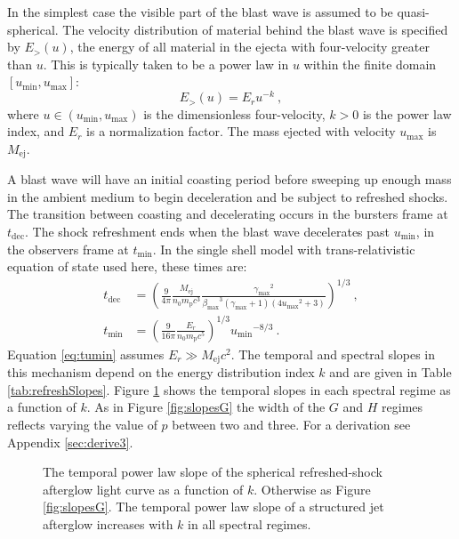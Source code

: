 \documentclass[twocolumn]{aastex62}
\newcommand{\Mej}{\ensuremath{M_{\mathrm{ej}}}}
\newcommand{\tdec}{\ensuremath{t_{\mathrm{dec}}}}
\newcommand{\tumin}{\ensuremath{t_{\mathrm{min}}}}
\newcommand{\Mp}{\ensuremath{m_{\mathrm{p}}}}
\newcommand{\umin}{\ensuremath{u_{\mathrm{min}}}}
\newcommand{\umax}{\ensuremath{u_{\mathrm{max}}}}
\newcommand{\gmax}{\ensuremath{\gamma_{\mathrm{max}}}}
\newcommand{\bmax}{\ensuremath{\beta_{\mathrm{max}}}}
\begin{document}
In the simplest case the visible part of the blast wave is assumed to be quasi-spherical.  The velocity distribution of material behind the blast wave is specified by $E_{>}(u)$, the energy of all material in the ejecta with four-velocity greater than $u$.  This is typically taken to be a power law in $u$ within the finite domain $[\umin, \umax]$:
\begin{equation}
	E_>(u) = E_r u^{-k}\ , \label{eq:Eu}
\end{equation}
where $u \in (\umin, \umax)$ is the dimensionless four-velocity, $k>0$ is the power law index, and $E_r$ is a normalization factor.  The mass ejected with velocity $\umax$ is $\Mej$.

%
%

A blast wave will have an initial coasting period before sweeping up enough mass in the ambient medium to begin deceleration and be subject to refreshed shocks.  The transition between coasting and decelerating occurs in the bursters frame at $\tdec$. The shock refreshment ends when the blast wave decelerates past $\umin$, in the observers frame at $\tumin$.  In the single shell model with trans-relativistic equation of state used here, these times are:
\begin{align}
	\tdec &= \left(\frac{9}{4\pi} \frac{\Mej}{n_0 \Mp c^3} \frac{\gmax^2}{\bmax^3(\gmax+1)(4\umax^2+3)} \right)^{1/3}  \ ,\label{eq:tdec} \\
	\tumin &= \left(\frac{9}{16\pi} \frac{E_r}{n_0 \Mp c^5}\right)^{1/3} \umin^{-8/3} \ .\label{eq:tumin}
\end{align}
Equation \eqref{eq:tumin} assumes $E_r \gg \Mej c^2$.   The temporal and spectral slopes in this mechanism depend on the energy distribution index $k$ and are given in Table \ref{tab:refreshSlopes}.  Figure \ref{fig:slopesK} shows the temporal slopes in each spectral regime as a function of $k$.  As in Figure \ref{fig:slopesG} the width of the $G$ and $H$ regimes reflects varying the value of $p$ between two and three.  For a derivation see Appendix \ref{sec:derive3}.  


%
%


\begin{figure}
	\caption{The temporal power law slope of the spherical refreshed-shock afterglow light curve as a function of $k$.  Otherwise as Figure \ref{fig:slopesG}.  The temporal power law slope of a structured jet afterglow increases with $k$ in all spectral regimes. \label{fig:slopesK}}
\end{figure}
\end{document}
